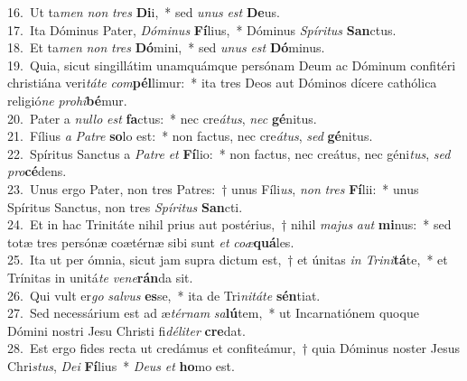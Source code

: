 {16.~}Ut ta\textit{men} \textit{non} \textit{tres} \textbf{Di}i,~* sed \textit{u}\textit{nus} \textit{est} \textbf{De}us.\\
{17.~}Ita Dóminus Pater, \textit{Dó}\textit{mi}\textit{nus} \textbf{Fí}lius,~* Dóminus \textit{Spí}\textit{ri}\textit{tus} \textbf{San}ctus.\\
{18.~}Et ta\textit{men} \textit{non} \textit{tres} \textbf{Dó}mini,~* sed \textit{u}\textit{nus} \textit{est} \textbf{Dó}minus.\\
{19.~}Quia, sicut singillátim unamquámque persónam Deum ac Dóminum confitéri christiána veri\textit{tá}\textit{te} \textit{com}\textbf{pél}limur:~* ita tres Deos aut Dóminos dícere cathólica religió\textit{ne} \textit{pro}\textit{hi}\textbf{bé}mur.\\
{20.~}Pater a \textit{nul}\textit{lo} \textit{est} \textbf{fa}ctus:~* nec cre\textit{á}\textit{tus}, \textit{nec} \textbf{gé}nitus.\\
{21.~}Fílius \textit{a} \textit{Pa}\textit{tre} \textbf{so}lo est:~* non factus, nec cre\textit{á}\textit{tus}, \textit{sed} \textbf{gé}nitus.\\
{22.~}Spíritus Sanctus a \textit{Pa}\textit{tre} \textit{et} \textbf{Fí}lio:~* non factus, nec creátus, nec géni\textit{tus}, \textit{sed} \textit{pro}\textbf{cé}dens.\\
{23.~}Unus ergo Pater, non tres Patres:~† unus Fíli\textit{us}, \textit{non} \textit{tres} \textbf{Fí}lii:~* unus Spíritus Sanctus, non tres \textit{Spí}\textit{ri}\textit{tus} \textbf{San}cti.\\
{24.~}Et in hac Trinitáte nihil prius aut postérius,~† nihil \textit{ma}\textit{jus} \textit{aut} \textbf{mi}nus:~* sed totæ tres persónæ coætérnæ sibi sunt \textit{et} \textit{co}\textit{æ}\textbf{quá}les.\\
{25.~}Ita ut per ómnia, sicut jam supra dictum est,~† et únitas \textit{in} \textit{Tri}\textit{ni}\textbf{tá}te,~* et Trínitas in unitá\textit{te} \textit{ve}\textit{ne}\textbf{rán}da sit.\\
{26.~}Qui vult er\textit{go} \textit{sal}\textit{vus} \textbf{es}se,~* ita de Tri\textit{ni}\textit{tá}\textit{te} \textbf{sén}tiat.\\
{27.~}Sed necessárium est ad æ\textit{tér}\textit{nam} \textit{sa}\textbf{lú}tem,~* ut Incarnatiónem quoque Dómini nostri Jesu Christi fi\textit{dé}\textit{li}\textit{ter} \textbf{cre}dat.\\
{28.~}Est ergo fides recta ut credámus et confiteámur,~† quia Dóminus noster Jesus Chri\textit{stus}, \textit{De}\textit{i} \textbf{Fí}lius~* \textit{De}\textit{us} \textit{et} \textbf{ho}mo est.\\
